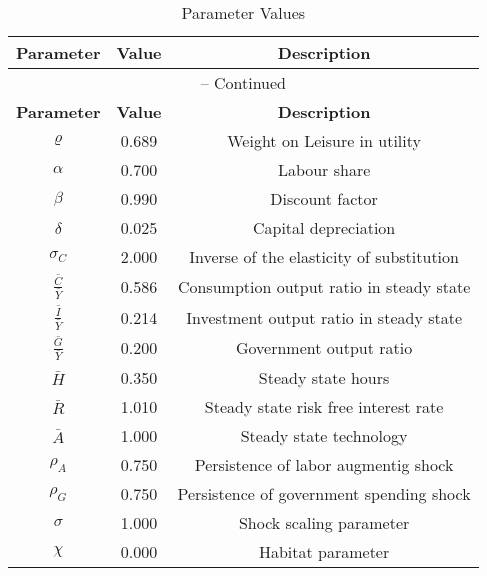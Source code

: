 \begin{center}
\begin{longtable}{ccc}
\caption{Parameter Values}\\%
\toprule%
\multicolumn{1}{c}{\textbf{Parameter}} &
\multicolumn{1}{c}{\textbf{Value}} &
 \multicolumn{1}{c}{\textbf{Description}}\\%
\midrule%
\endfirsthead
\multicolumn{3}{c}{{\tablename} \thetable{} -- Continued}\\%
\midrule%
\multicolumn{1}{c}{\textbf{Parameter}} &
\multicolumn{1}{c}{\textbf{Value}} &
  \multicolumn{1}{c}{\textbf{Description}}\\%
\midrule%
\endhead
${\varrho}$ 	 & 	 0.689 	 & 	 Weight on Leisure in utility\\
${\alpha}$ 	 & 	 0.700 	 & 	 Labour share\\
${\beta}$ 	 & 	 0.990 	 & 	 Discount factor\\
${\delta}$ 	 & 	 0.025 	 & 	 Capital depreciation\\
${\sigma_{C}}$ 	 & 	 2.000 	 & 	 Inverse of the elasticity of substitution\\
$\frac{\bar{C}}{\bar{Y}}$ 	 & 	 0.586 	 & 	 Consumption output ratio in steady state\\
$\frac{\bar{I}}{\bar{Y}}$ 	 & 	 0.214 	 & 	 Investment output ratio in steady state\\
$\frac{\bar{G}}{\bar{Y}}$ 	 & 	 0.200 	 & 	 Government output ratio\\
$\bar{H}$ 	 & 	 0.350 	 & 	 Steady state hours\\
$\bar{R}$ 	 & 	 1.010 	 & 	 Steady state risk free interest rate\\
$\bar{A}$ 	 & 	 1.000 	 & 	 Steady state technology\\
${\rho_{A}}$ 	 & 	 0.750 	 & 	 Persistence of labor augmentig shock\\
${\rho_{G}}$ 	 & 	 0.750 	 & 	 Persistence of government spending shock\\
${\sigma}$ 	 & 	 1.000 	 & 	 Shock scaling parameter\\
${\chi}$ 	 & 	 0.000 	 & 	 Habitat parameter\\
\bottomrule%
\end{longtable}
\end{center}
